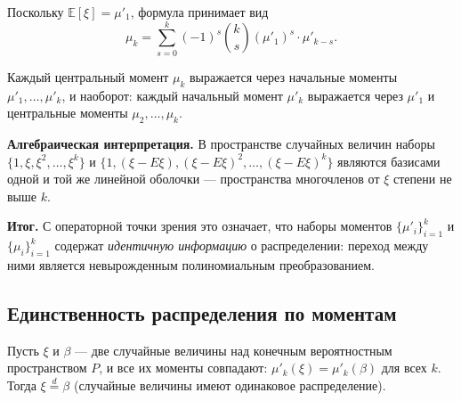 \begin{Corollary}{}{}
	Поскольку $\mathbb{E}[\xi] = \mu'_1$, формула принимает вид
	\[
	\mu_k = \sum_{s=0}^{k} (-1)^s \binom{k}{s} (\mu'_1)^s \cdot \mu'_{k-s}.
	\]
\end{Corollary}

\begin{Corollary}{}{}
	Каждый центральный момент $\mu_k$ выражается через начальные моменты $\mu'_1, \ldots, \mu'_k$,
	и наоборот: каждый начальный момент $\mu'_k$ выражается через $\mu'_1$ и центральные моменты $\mu_2, \ldots, \mu_k$.
\end{Corollary}

\begin{Remark}{}{}
	\textbf{Алгебраическая интерпретация.} В пространстве случайных величин наборы $\{1, \xi, \xi^2, \ldots, \xi^k\}$ и $\{1, (\xi-E\xi), (\xi-E\xi)^2, \ldots, (\xi-E\xi)^k\}$ являются базисами одной и той же линейной оболочки — пространства многочленов от $\xi$ степени не выше $k$. 
	
	\textbf{Итог.} С операторной точки зрения это означает, что наборы моментов $\{\mu'_i\}_{i=1}^k$ и $\{\mu_i\}_{i=1}^k$ содержат \emph{идентичную информацию} о распределении: переход между ними является невырожденным полиномиальным преобразованием.
\end{Remark}

\subsection{Единственность распределения по моментам}

\begin{Theorem}{}{}
	Пусть $\xi$ и $\beta$ — две случайные величины над конечным вероятностным пространством $P$,
	и все их моменты совпадают: $\mu'_k(\xi) = \mu'_k(\beta)$ для всех $k$.
	Тогда $\xi \overset{d}{=} \beta$ (случайные величины имеют одинаковое распределение).
\end{Theorem}

